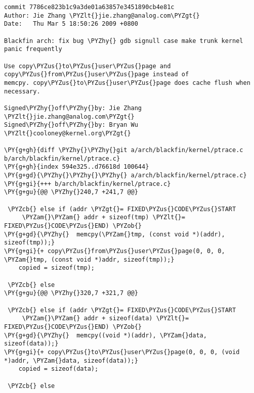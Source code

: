 \begin{Verbatim}[commandchars=\\\{\}]
commit 7786ce823b1c9a3de01a63857e3451890cb4e81c
Author: Jie Zhang \PYZlt{}jie.zhang@analog.com\PYZgt{}
Date:   Thu Mar 5 18:50:26 2009 +0800

Blackfin arch: fix bug \PYZhy{} gdb signull case make trunk kernel panic frequently

Use copy\PYZus{}to\PYZus{}user\PYZus{}page and copy\PYZus{}from\PYZus{}user\PYZus{}page instead of
memcpy. copy\PYZus{}to\PYZus{}user\PYZus{}page does cache flush when necessary.

Signed\PYZhy{}off\PYZhy{}by: Jie Zhang \PYZlt{}jie.zhang@analog.com\PYZgt{}
Signed\PYZhy{}off\PYZhy{}by: Bryan Wu \PYZlt{}cooloney@kernel.org\PYZgt{}

\PY{g+gh}{diff \PYZhy{}\PYZhy{}git a/arch/blackfin/kernel/ptrace.c b/arch/blackfin/kernel/ptrace.c}
\PY{g+gh}{index 594e325..d76618d 100644}
\PY{g+gd}{\PYZhy{}\PYZhy{}\PYZhy{} a/arch/blackfin/kernel/ptrace.c}
\PY{g+gi}{+++ b/arch/blackfin/kernel/ptrace.c}
\PY{g+gu}{@@ \PYZhy{}240,7 +241,7 @@}
 
 \PYZcb{} else if (addr \PYZgt{}= FIXED\PYZus{}CODE\PYZus{}START
     \PYZam{}\PYZam{} addr + sizeof(tmp) \PYZlt{}= FIXED\PYZus{}CODE\PYZus{}END) \PYZob{}
\PY{g+gd}{\PYZhy{}	memcpy(\PYZam{}tmp, (const void *)(addr), sizeof(tmp));}
\PY{g+gi}{+	copy\PYZus{}from\PYZus{}user\PYZus{}page(0, 0, 0, \PYZam{}tmp, (const void *)addr, sizeof(tmp));}
 	copied = sizeof(tmp);
 
 \PYZcb{} else
\PY{g+gu}{@@ \PYZhy{}320,7 +321,7 @@}
 
 \PYZcb{} else if (addr \PYZgt{}= FIXED\PYZus{}CODE\PYZus{}START
     \PYZam{}\PYZam{} addr + sizeof(data) \PYZlt{}= FIXED\PYZus{}CODE\PYZus{}END) \PYZob{}
\PY{g+gd}{\PYZhy{}	memcpy((void *)(addr), \PYZam{}data, sizeof(data));}
\PY{g+gi}{+	copy\PYZus{}to\PYZus{}user\PYZus{}page(0, 0, 0, (void *)addr, \PYZam{}data, sizeof(data));}
 	copied = sizeof(data);
 
 \PYZcb{} else
\end{Verbatim}
